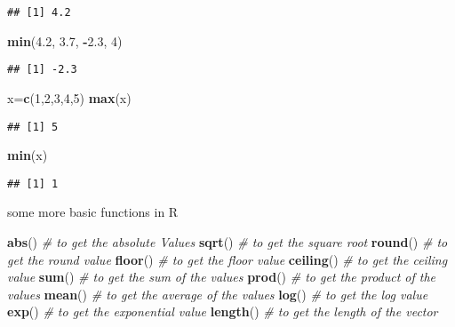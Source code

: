 \documentclass[
]{article}
\newenvironment{Shaded}{\begin{snugshade}}{\end{snugshade}}
\newcommand{\CommentTok}[1]{\textcolor[rgb]{0.56,0.35,0.01}{\textit{#1}}}
\newcommand{\DecValTok}[1]{\textcolor[rgb]{0.00,0.00,0.81}{#1}}
\newcommand{\FloatTok}[1]{\textcolor[rgb]{0.00,0.00,0.81}{#1}}
\newcommand{\FunctionTok}[1]{\textcolor[rgb]{0.13,0.29,0.53}{\textbf{#1}}}
\newcommand{\NormalTok}[1]{#1}
\newcommand{\OtherTok}[1]{\textcolor[rgb]{0.56,0.35,0.01}{#1}}
\newcommand{\SpecialCharTok}[1]{\textcolor[rgb]{0.81,0.36,0.00}{\textbf{#1}}}
\begin{document}
\begin{verbatim}
## [1] 4.2
\end{verbatim}

\begin{Shaded}
\begin{Highlighting}[]
\FunctionTok{min}\NormalTok{(}\FloatTok{4.2}\NormalTok{, }\FloatTok{3.7}\NormalTok{, }\SpecialCharTok{{-}}\FloatTok{2.3}\NormalTok{, }\DecValTok{4}\NormalTok{)}
\end{Highlighting}
\end{Shaded}

\begin{verbatim}
## [1] -2.3
\end{verbatim}

\begin{Shaded}
\begin{Highlighting}[]
\NormalTok{x}\OtherTok{=}\FunctionTok{c}\NormalTok{(}\DecValTok{1}\NormalTok{,}\DecValTok{2}\NormalTok{,}\DecValTok{3}\NormalTok{,}\DecValTok{4}\NormalTok{,}\DecValTok{5}\NormalTok{)}
\FunctionTok{max}\NormalTok{(x)}
\end{Highlighting}
\end{Shaded}

\begin{verbatim}
## [1] 5
\end{verbatim}

\begin{Shaded}
\begin{Highlighting}[]
\FunctionTok{min}\NormalTok{(x)}
\end{Highlighting}
\end{Shaded}

\begin{verbatim}
## [1] 1
\end{verbatim}

some more basic functions in R

\begin{Shaded}
\begin{Highlighting}[]
\FunctionTok{abs}\NormalTok{()      }\CommentTok{\# to get the absolute Values}
\FunctionTok{sqrt}\NormalTok{()     }\CommentTok{\# to get the square root}
\FunctionTok{round}\NormalTok{()    }\CommentTok{\# to get the round value}
\FunctionTok{floor}\NormalTok{()    }\CommentTok{\# to get the floor value }
\FunctionTok{ceiling}\NormalTok{()  }\CommentTok{\# to get the ceiling value}
\FunctionTok{sum}\NormalTok{()      }\CommentTok{\# to get the sum of the values}
\FunctionTok{prod}\NormalTok{()     }\CommentTok{\# to get the product of the values}
\FunctionTok{mean}\NormalTok{()     }\CommentTok{\# to get the average of the values}
\FunctionTok{log}\NormalTok{()      }\CommentTok{\# to get the log value}
\FunctionTok{exp}\NormalTok{()      }\CommentTok{\# to get the exponential value}
\FunctionTok{length}\NormalTok{()   }\CommentTok{\# to get the length of the vector}
\end{Highlighting}
\end{Shaded}
\end{document}
